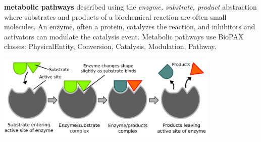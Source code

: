 \begin{frame}
\begin{block}{\textbf{metabolic pathways}}
described using the {\it enzyme, substrate,
product} abstraction where substrates and products of a biochemical reaction are often small molecules. An enzyme, often a protein, catalyzes the reaction, and inhibitors and activators can modulate the catalysis event. Metabolic pathways use BioPAX classes: PhysicalEntity, Conversion, Catalysis, Modulation, Pathway.
\end{block}
\begin{center}
\includegraphics[width=0.8\textwidth]{fig/EnzymeSubstrateProduct.pdf}
\end{center}
\end{frame}